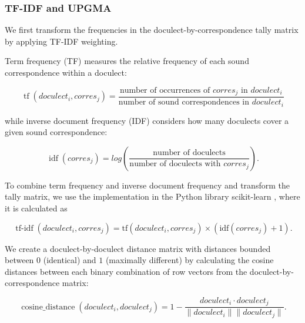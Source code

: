 \documentclass[a4paper]{article}
\begin{document}
\subsubsection{TF-IDF and UPGMA}
\label{subsubsec:tfidf}

We first transform the frequencies
in the doculect-by-correspondence tally matrix
by applying TF-IDF weighting.


Term frequency (TF) measures the relative frequency
of each sound correspondence within a doculect:

\begin{equation*}
\operatorname{tf}(doculect_i, corres_j) =
\frac{\text{number of occurrences of } corres_j \text{ in } doculect_i}
{\text{number of sound correspondences in } doculect_i}
\end{equation*}

while inverse document frequency (IDF)
considers how many doculects cover a given
sound correspondence:

\begin{equation*}
\operatorname{idf}(corres_j) =
log(
\frac{\text{number of doculects}}
{\text{number of doculects with } corres_j}
).
\end{equation*}

To combine term frequency and inverse document frequency
and transform the tally matrix, 
we use the implementation in the Python library scikit-learn
\citep{pedregosa2011scikit-learn},
where it is calculated as

\begin{equation*}
\operatorname{tf-idf}(doculect_i, corres_j) =
\text{tf}(doculect_i, corres_j)
\times
(
\text{idf}(corres_j)
+ 1).
\end{equation*}


We create a doculect-by-doculect distance matrix
with distances bounded between $0$ (identical) and $1$ (maximally different)
by calculating the cosine distances between each
binary combination of row vectors from the doculect-by-correspondence matrix:

\begin{equation*}
\operatorname{cosine\_distance}(doculect_i,doculect_j) =
1 -
\frac{doculect_i \cdot doculect_j}{\lVert doculect_i \rVert \lVert doculect_j \rVert}
.
\end{equation*}
\end{document}
